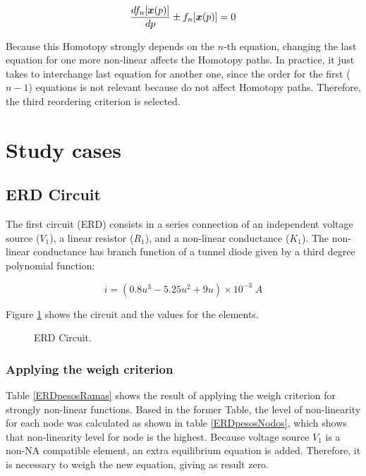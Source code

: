 \documentclass[conference,letterpaper,onecolumn,11pt]{IEEEtran}
\newcommand{\pig}[1]{\mbox{\boldmath ${#1}$}	}
\begin{document}
\begin{equation}
{  {{d f_n [\pig{x}(p)]} \over {dp} } \pm f_n [\pig{x}(p)]=0}
\label{chaobis2}
\end{equation}

Because this Homotopy strongly depends on the $n$-th equation, changing the last equation for one more non-linear affects the Homotopy paths. In practice, it just takes to interchange last equation for another one, since the order for the first ($n-1$) equations is not relevant because do not affect Homotopy paths. Therefore, the third reordering criterion is selected.

\section{Study cases}

\subsection{ERD Circuit}

The first circuit (ERD) consists in a series connection of an independent voltage source ($V_1$), a linear resistor ($R_1$), and a non-linear conductance ($K_1$). The non-linear conductance has branch function of a tunnel diode given by a third degree polynomial function:

\begin{displaymath}
i = \left( 0.8u^3-5.25u^2+9u \right) \times 10^{-3} \;A
\end{displaymath}

Figure \ref{cirERD} shows the circuit and the values for the elements.

\begin{figure}[!h]
\centerline{
\epsfxsize=90mm
}
\caption{ERD Circuit.}
\label{cirERD}
\end{figure}

\subsubsection{Applying the weigh criterion}

Table \ref{ERDpesosRamas} shows the result of applying the weigh criterion for strongly non-linear functions. Based in the former Table, the level of non-linearity for each node was calculated as shown in table \ref{ERDpesosNodos}, which shows that non-linearity level for node   is the highest. Because voltage source $V_1$ is a non-NA compatible element, an extra equilibrium equation is added. Therefore, it is necessary to weigh the new equation, giving as result zero.
\end{document}
